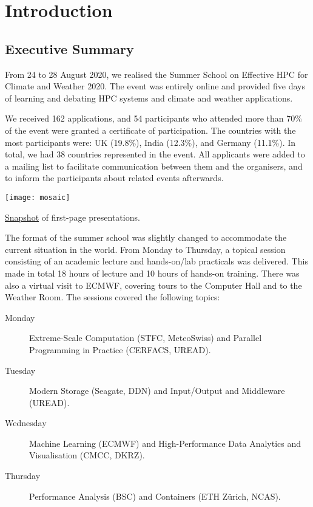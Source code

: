 \chapter{Introduction}
\label{ch:intro}

\section{Executive Summary}

From 24 to 28 August 2020, we realised the Summer School on Effective HPC for Climate and Weather 2020. The event was entirely online and provided five days of learning and debating HPC systems and climate and weather applications.

We received 162 applications, and 54 participants who attended more than 70\% of the event were granted a certificate of participation. The countries with the most participants were: UK (19.8\%), India (12.3\%), and Germany (11.1\%). In total, we had 38 countries represented in the event. All applicants were added to a mailing list to facilitate communication between them and the organisers, and to inform the participants about related events afterwards.

\begin{table}[H]
\centering
\texttt{[image: mosaic]}
\caption{\href{https://www.photojoiner.net/v/BTvmSc6R}{Snapshot} of first-page presentations.}
\end{table}

The format of the summer school was slightly changed to accommodate the current situation in the world. From Monday to Thursday, a topical session consisting of an academic lecture and hands-on/lab practicals was delivered. This made in total 18 hours of lecture and 10 hours of hands-on training. There was also a virtual visit to ECMWF, covering tours to the Computer Hall and to the Weather Room. The sessions covered the following topics:

\begin{description}

\item[Monday] Extreme-Scale Computation (STFC, MeteoSwiss) and Parallel Programming in Practice (CERFACS, UREAD).

\item[Tuesday] Modern Storage (Seagate, DDN) and Input/Output and Middleware (UREAD).

\item[Wednesday] Machine Learning (ECMWF) and High-Performance Data Analytics and Visualisation (CMCC, DKRZ).

\item[Thursday] Performance Analysis (BSC) and Containers (ETH Zürich, NCAS).

\end{description}

